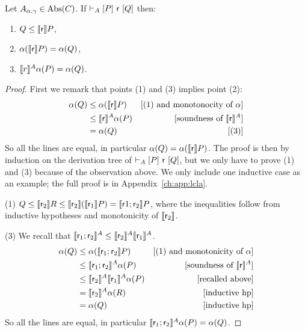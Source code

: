 \begin{theorem}\label{th:lcla:soundness-ext}
	Let $A_{\alpha, \gamma} \in \text{\normalfont Abs}(C)$.
	If $\vdash_{A}\nobreak[P]~\mathsf{r}~[Q]$ then:
	\begin{enumerate}
		\item $Q \le \llbracket\mathsf{r}\rrbracket P$,
		\item $\alpha(\llbracket\mathsf{r}\rrbracket P) = \alpha(Q)$,
		\item $\llbracket r\rrbracket^A \alpha(P) = \alpha(Q)$.
	\end{enumerate}
\end{theorem}
\begin{proof}
	First we remark that points (1) and (3) implies point (2):
	\begin{align*}
		\alpha(Q) &\le \alpha(\llbracket\mathsf{r}\rrbracket P) &[\text{(1) and monotonocity of }\alpha] \\
		&\le \llbracket\mathsf{r}\rrbracket^{A} \alpha(P) &[\text{soundness of }\llbracket\mathsf{r}\rrbracket^{A}] \\
		&= \alpha(Q) &[\text{(3)}]
	\end{align*}
	So all the lines are equal, in particular $\alpha(Q) = \alpha(\llbracket\mathsf{r}\rrbracket P)$.
	The proof is then by induction on the derivation tree of $\vdash_{A}\nobreak[P]~\mathsf{r}~[Q]$, but we only have to prove (1) and (3) because of the observation above.
	We only include one inductive case as an example; the full proof is in Appendix~\ref{ch:app:lcla}.
	
	\noindent (1) $Q \le \llbracket\mathsf{r}_2\rrbracket R \le \llbracket\mathsf{r}_2\rrbracket (\llbracket\mathsf{r}_1\rrbracket P) = \llbracket\mathsf{r}1; \mathsf{r}_2\rrbracket P$, where the inequalities follow from inductive hypotheses and monotonicity of $\llbracket\mathsf{r}_2\rrbracket$.
	
	\noindent (3) We recall that $\llbracket\mathsf{r}_1; \mathsf{r}_2\rrbracket^{A} \le \llbracket\mathsf{r}_2\rrbracket^{A} \llbracket\mathsf{r}_1\rrbracket^{A}$.
	\begin{align*}
		\alpha(Q) &\le \alpha(\llbracket\mathsf{r}_1; \mathsf{r}_2\rrbracket P) &[\text{(1) and monotonicity of }\alpha] \\
		&\le \llbracket\mathsf{r}_1; \mathsf{r}_2\rrbracket^{A} \alpha(P) &[\text{soundness of }\llbracket\mathsf{r}\rrbracket^{A}] \\
		&\le \llbracket\mathsf{r}_2\rrbracket^{A} \llbracket\mathsf{r}_1\rrbracket^{A} \alpha(P) &[\text{recalled above}] \\
		&= \llbracket\mathsf{r}_2\rrbracket^{A} \alpha(R) &[\text{inductive hp}] \\
		&= \alpha(Q) &[\text{inductive hp}]
	\end{align*}
	So all the lines are equal, in particular $\llbracket\mathsf{r}_1; \mathsf{r}_2\rrbracket^{A} \alpha(P) = \alpha(Q)$.
\end{proof}


